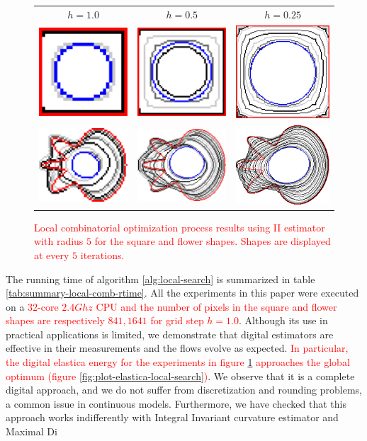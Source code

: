 \documentclass[smallextended]{svjour3}       %
\newcommand{\revision}[1]{\textcolor{red}{#1}}
\begin{document}
		
\begin{figure}[!h]
	\center
	\begin{tabular}{ccc}
		$h=1.0$ & $h=0.5$ & $h=0.25$\\
		\includegraphics[scale=0.2]{local_search_square_h1_summary.pdf} & \includegraphics[scale=0.2]{local_search_square_h05_summary.pdf} & \includegraphics[scale=0.2]{local_search_square_h025_summary.pdf} \\
		\includegraphics[scale=0.2]{local_search_flower_h1_summary.pdf} & \includegraphics[scale=0.2]{local_search_flower_h05_summary.pdf} & \includegraphics[scale=0.2]{local_search_flower_h025_summary.pdf}
	\end{tabular}	
		\caption{\revision{Local combinatorial optimization process results using II estimator with radius $5$ for the square and flower shapes. Shapes are displayed at every $5$ iterations.}}	
		\label{fig:local-comb-square-results}		
\end{figure}


The running time of algorithm \ref{alg:local-search} is summarized in table \ref{tab:summary-local-comb-rtime}. All the
experiments in this paper were executed on a \revision{$32$-core $2.4Ghz$ CPU and the number of pixels in the square and
flower shapes are respectively $841,1641$ for grid step $h=1.0$}. Although its use in practical applications is
limited, we demonstrate that digital estimators are effective in their measurements and the flows evolve as expected. \revision{In particular, the digital elastica energy for the experiments in figure \ref{fig:local-comb-square-results} approaches the global optimum (figure  \ref{fig:plot-elastica-local-search})}. We
observe that it is a complete digital approach, and we do not suffer from discretization and rounding problems, a common
issue in continuous models.  Furthermore, we have checked that this approach works indifferently with Integral Invariant
curvature estimator and Maximal Di
\end{document}
